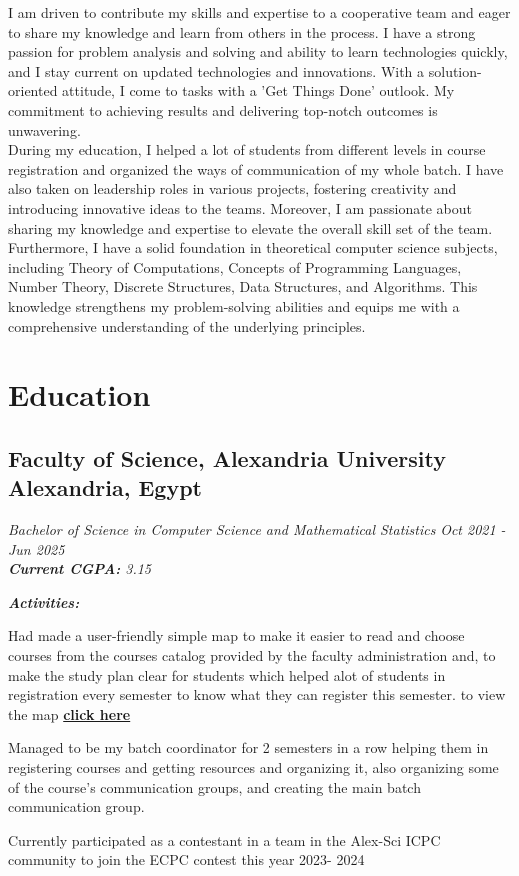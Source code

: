 \documentclass[a4paper,12pt]{article}
\begin{document}
	
 		I am driven to contribute my skills and expertise to a cooperative team and eager to share my knowledge and learn from others in the process.  I have a strong passion for problem analysis and solving and ability to learn technologies quickly, and I stay current on updated technologies and innovations. With a solution-oriented attitude, I come to tasks with a 'Get Things Done' outlook. My commitment to achieving results and delivering top-notch outcomes is unwavering.\\

			
		During my education, I helped a lot of students from different levels in course registration and organized the ways of communication of my whole batch. I have also taken on leadership roles in various projects, fostering creativity and introducing innovative ideas to the teams. Moreover, I am passionate about sharing my knowledge and expertise to elevate the overall skill set of the team. Furthermore, I have a solid foundation in theoretical computer science subjects, including Theory of Computations, Concepts of Programming Languages, Number Theory, Discrete Structures, Data Structures, and Algorithms. This knowledge strengthens my problem-solving abilities and equips me with a comprehensive understanding of the underlying principles.


	\section{Education}
		\subsection{Faculty of Science, Alexandria University \hfill \small{Alexandria, Egypt}}
			\vspace{-3mm}
			\textit{Bachelor of Science in Computer Science and Mathematical Statistics} \hfill \small\textit{Oct 2021 - Jun 2025}\\
			
			\textit{\textbf{Current CGPA: } 3.15}

			\textit{\textbf{Activities:}}
			\begin{itemize}
					 \small{\item Had made a user-friendly simple map to make it easier to read and choose courses from the courses catalog provided by the faculty administration and, to make the study plan clear for students which helped alot of students in registration every semester to know what they can register this semester.
						\scriptsize{to view the map \href{https://drive.google.com/file/d/1Z6P57HZftHR9ng1x2sYMtcG8yeUXJsrg/view?usp=sharing}{\textbf{click here}}}}
						
					 \small{\item Managed to be my batch coordinator for 2 semesters in a row helping them in registering courses and getting resources and organizing it, also organizing some of the course's communication groups, and creating the main batch communication group.}
						\item{Currently participated as a contestant in a team in the Alex-Sci ICPC community to join the ECPC contest this year 2023- 2024}
			\end{itemize}
\end{document}
